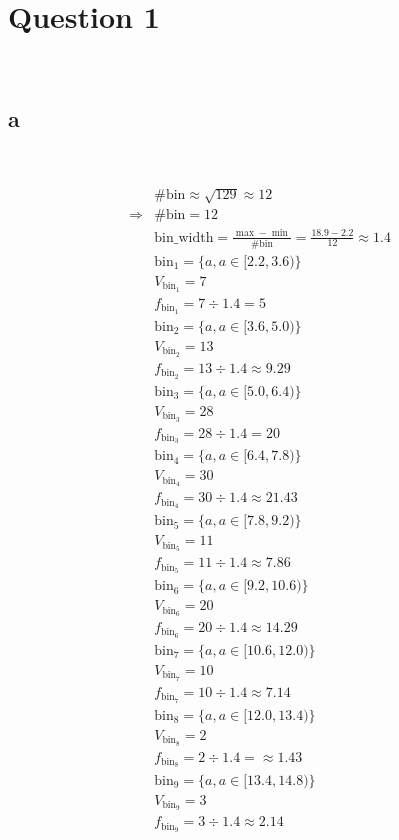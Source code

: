 \documentclass{article}
\begin{document}
\section*{Question 1}

~

\subsection*{a}

~

\begin{align*}
    &\#\mathrm{bin}\approx \sqrt{129}\approx 12\\
    \Rightarrow&\#\mathrm{bin}=12\\
    &\mathrm{bin\_width}=\frac{\max-\min}{\#\mathrm{bin}}=\frac{18.9-2.2}{12}\approx1.4\\
    &\mathrm{bin}_1=\{a,a\in[2.2,3.6)\}\\
    &V_{\mathrm{bin}_1}=7\\
    &f_{\mathrm{bin}_1}=7\div1.4=5\\ 
    &\mathrm{bin}_2=\{a,a\in[3.6,5.0)\}\\
    &V_{\mathrm{bin}_2}=13\\
    &f_{\mathrm{bin}_2}=13\div1.4\approx9.29\\ 
    &\mathrm{bin}_3=\{a,a\in[5.0,6.4)\}\\
    &V_{\mathrm{bin}_3}=28\\
    &f_{\mathrm{bin}_3}=28\div1.4=20\\ 
    &\mathrm{bin}_4=\{a,a\in[6.4,7.8)\}\\
    &V_{\mathrm{bin}_4}=30\\
    &f_{\mathrm{bin}_4}=30\div1.4\approx21.43\\ 
    &\mathrm{bin}_5=\{a,a\in[7.8,9.2)\}\\
    &V_{\mathrm{bin}_5}=11\\
    &f_{\mathrm{bin}_5}=11\div1.4\approx7.86\\ 
    &\mathrm{bin}_6=\{a,a\in[9.2,10.6)\}\\
    &V_{\mathrm{bin}_6}=20\\
    &f_{\mathrm{bin}_6}=20\div1.4\approx14.29\\
    &\mathrm{bin}_7=\{a,a\in[10.6,12.0)\}\\
    &V_{\mathrm{bin}_7}=10\\
    &f_{\mathrm{bin}_7}=10\div1.4\approx7.14\\ 
    &\mathrm{bin}_8=\{a,a\in[12.0,13.4)\}\\
    &V_{\mathrm{bin}_8}=2\\
    &f_{\mathrm{bin}_8}=2\div1.4=\approx1.43\\ 
    &\mathrm{bin}_9=\{a,a\in[13.4,14.8)\}\\
    &V_{\mathrm{bin}_9}=3\\
    &f_{\mathrm{bin}_9}=3\div1.4\approx2.14\\ 
\end{align*}
\end{document}
